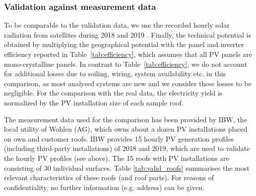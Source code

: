 \subsubsection{Validation against measurement data}

To be comparable to the validation data, we use the recorded hourly solar radiation from satellites during 2018 and 2019 \cite{stockli_daily_2013}.
Finally, the technical potential is obtained by multiplying the geographical potential with the panel and inverter efficiency reported in Table~\ref{tab:efficiency}, which assumes that all PV panels are mono-crystalline panels. In contrast to Table~\ref{tab:efficiency}, we do not account for additional losses due to soiling, wiring, system availability etc. in this comparison, as most analysed systems are new and we consider these losses to be negligible. For the comparison with the real data, the electricity yield is normalized by the PV installation size of each sample roof.

The measurement data used for the comparison has been provided by IBW, the local utility of Wohlen (AG), which owns about a dozen PV installations placed on own and customer roofs. IBW provides 15 hourly PV generation profiles (including third-party installations) of 2018 and 2019, which are used to validate the hourly PV profiles (see above). The 15 roofs with PV installations are consisting of 30 individual surfaces. 
Table \ref{tab:valid_roofs} summarises the most relevant characteristics of these roofs (and roof parts). For reasons of confidentiality, no further information (e.g. address) can be given.  

